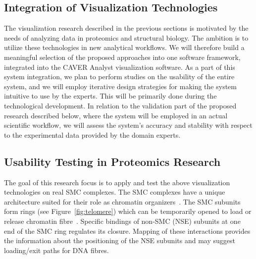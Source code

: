 \documentclass[11pt,a4paper,titlepage,oneside,onecolumn]{article}
\begin{document}





\subsection{Integration of Visualization Technologies}

The visualization research described in the previous sections is motivated by the needs of analyzing data in proteomics and structural biology. 
The ambition is to utilize these technologies in new analytical workflows.
We will therefore build a meaningful selection of the proposed approaches into one software framework, integrated into the CAVER Analyst visualization software. 
As a part of this system integration, we plan to perform studies on the usability of the entire system, and we will employ iterative design strategies for making the system intuitive to use by the experts. 
This will be primarily done during the technological development. 
In relation to the validation part of the proposed research described below, where the system will be employed in an actual scientific workflow, we will assess the system's accuracy and stability with respect to the experimental data provided by the domain experts.


\subsection{Usability Testing in Proteomics Research}
\label{sec:smc}
The goal of this research focus is to apply and test the above visualization technologies on real SMC complexes. 
The SMC complexes have a unique architecture suited for their role as chromatin organizers~\cite{Palecek2015}. 
The SMC subunits form rings (see Figure~\ref{fig:telomere}) which can be temporarily opened to load or release chromatin fibre~\cite{Haering2016}. 
Specific bindings of non-SMC (NSE) subunits at one end of the SMC ring regulates its closure. 
Mapping of these interactions provides the information about the positioning of the NSE subunits and may suggest loading/exit paths for DNA fibres.
\end{document}
